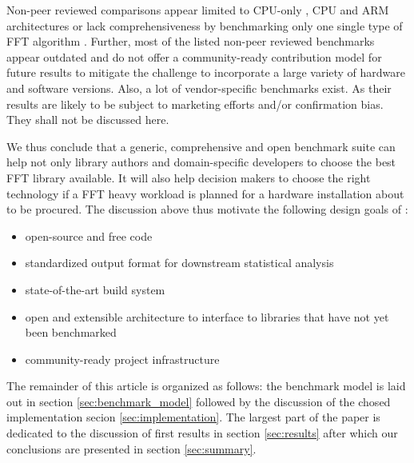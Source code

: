 Non-peer reviewed comparisons appear limited to CPU-only \cite{benchFFT}, CPU and ARM architectures \cite{roy_longbottom} or lack comprehensiveness by benchmarking only one single type of FFT algorithm \cite{fft_check}. Further, most of the listed non-peer reviewed benchmarks appear outdated and do not offer a community-ready contribution model for future results to mitigate the challenge to incorporate a large variety of hardware and software versions. Also, a lot of vendor-specific benchmarks exist. As their results are likely to be subject to marketing efforts and/or confirmation bias. They shall not be discussed here.

We thus conclude that a generic, comprehensive and open benchmark suite can help not only library authors and domain-specific developers to choose the best FFT library available. It will also help decision makers to choose the right technology if a FFT heavy workload is planned for a hardware installation about to be procured. The discussion above thus motivate the following design goals of \gearshifft{}:

\begin{itemize}
\item open-source and free code
\item standardized output format for downstream statistical analysis
\item state-of-the-art build system
\item open and extensible architecture to interface to libraries that have not yet been benchmarked
\item community-ready project infrastructure
\end{itemize}

The remainder of this article is organized as follows: the benchmark model is laid out in section \ref{sec:benchmark_model} followed by the discussion of the chosed implementation secion \ref{sec:implementation}. The largest part of the paper is dedicated to the discussion of first results in section \ref{sec:results} after which our conclusions are presented in section \ref{sec:summary}.



%

